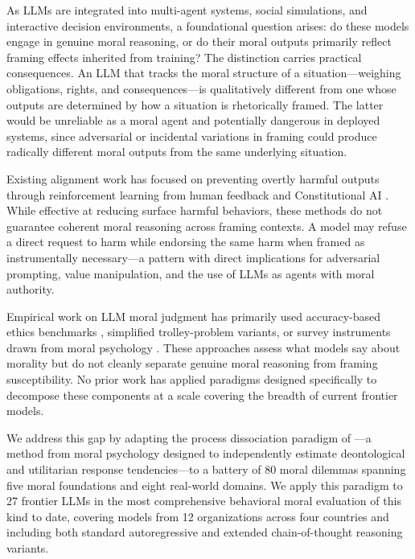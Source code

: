 \documentclass{article}
\begin{document}
As LLMs are integrated into multi-agent systems, social simulations, and interactive decision environments, a foundational question arises: do these models engage in genuine moral reasoning, or do their moral outputs primarily reflect framing effects inherited from training? The distinction carries practical consequences. An LLM that tracks the moral structure of a situation—weighing obligations, rights, and consequences—is qualitatively different from one whose outputs are determined by how a situation is rhetorically framed. The latter would be unreliable as a moral agent and potentially dangerous in deployed systems, since adversarial or incidental variations in framing could produce radically different moral outputs from the same underlying situation.

Existing alignment work has focused on preventing overtly harmful outputs through reinforcement learning from human feedback \citep{ouyang2022training} and Constitutional AI \citep{bai2022constitutional}. While effective at reducing surface harmful behaviors, these methods do not guarantee coherent moral reasoning across framing contexts. A model may refuse a direct request to harm while endorsing the same harm when framed as instrumentally necessary—a pattern with direct implications for adversarial prompting, value manipulation, and the use of LLMs as agents with moral authority.

Empirical work on LLM moral judgment has primarily used accuracy-based ethics benchmarks \citep{hendrycks2021aligning, scherrer2024evaluating}, simplified trolley-problem variants, or survey instruments drawn from moral psychology \citep{abdulhai2023moral}. These approaches assess what models say about morality but do not cleanly separate genuine moral reasoning from framing susceptibility. No prior work has applied paradigms designed specifically to decompose these components at a scale covering the breadth of current frontier models.

We address this gap by adapting the process dissociation paradigm of \citet{conway2013deontological}—a method from moral psychology designed to independently estimate deontological and utilitarian response tendencies—to a battery of 80 moral dilemmas spanning five moral foundations \citep{graham2009liberals} and eight real-world domains. We apply this paradigm to 27 frontier LLMs in the most comprehensive behavioral moral evaluation of this kind to date, covering models from 12 organizations across four countries and including both standard autoregressive and extended chain-of-thought reasoning variants.
\end{document}
